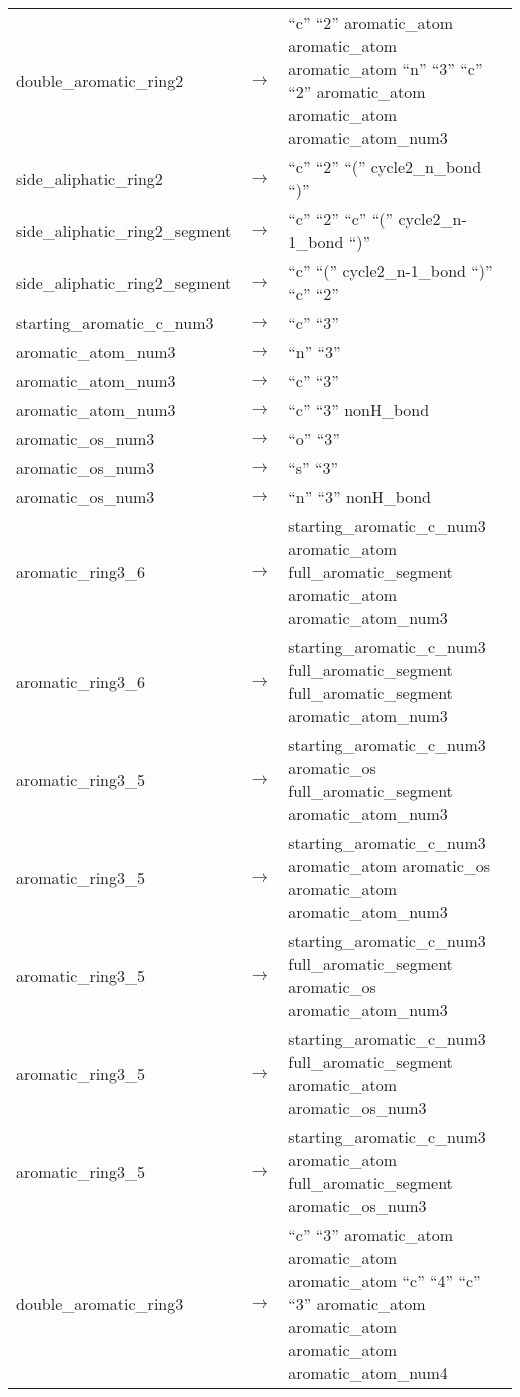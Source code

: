 \documentclass[../Document.tex]{subfiles}
\begin{document}
\begin{longtable}{m{} p{} p{}}
    double\_aromatic\_ring2 & $\rightarrow$ & ``c'' ``2'' aromatic\_atom aromatic\_atom aromatic\_atom ``n'' ``3'' ``c'' ``2'' aromatic\_atom aromatic\_atom aromatic\_atom\_num3 \\
    side\_aliphatic\_ring2 & $\rightarrow$ & ``c'' ``2'' ``('' cycle2\_n\_bond ``)'' \\
    side\_aliphatic\_ring2\_segment & $\rightarrow$ & ``c'' ``2'' ``c'' ``('' cycle2\_n-1\_bond ``)'' \\
    side\_aliphatic\_ring2\_segment & $\rightarrow$ & ``c'' ``('' cycle2\_n-1\_bond ``)'' ``c'' ``2'' \\
    starting\_aromatic\_c\_num3 & $\rightarrow$ & ``c'' ``3'' \\
    aromatic\_atom\_num3 & $\rightarrow$ & ``n'' ``3'' \\
    aromatic\_atom\_num3 & $\rightarrow$ & ``c'' ``3'' \\
    aromatic\_atom\_num3 & $\rightarrow$ & ``c'' ``3'' nonH\_bond \\
    aromatic\_os\_num3 & $\rightarrow$ & ``o'' ``3'' \\
    aromatic\_os\_num3 & $\rightarrow$ & ``s'' ``3'' \\
    aromatic\_os\_num3 & $\rightarrow$ & ``n'' ``3'' nonH\_bond \\
    aromatic\_ring3\_6 & $\rightarrow$ & starting\_aromatic\_c\_num3 aromatic\_atom full\_aromatic\_segment aromatic\_atom aromatic\_atom\_num3 \\
    aromatic\_ring3\_6 & $\rightarrow$ & starting\_aromatic\_c\_num3 full\_aromatic\_segment full\_aromatic\_segment aromatic\_atom\_num3 \\
    aromatic\_ring3\_5 & $\rightarrow$ & starting\_aromatic\_c\_num3 aromatic\_os full\_aromatic\_segment aromatic\_atom\_num3 \\
    aromatic\_ring3\_5 & $\rightarrow$ & starting\_aromatic\_c\_num3 aromatic\_atom aromatic\_os aromatic\_atom aromatic\_atom\_num3 \\
    aromatic\_ring3\_5 & $\rightarrow$ & starting\_aromatic\_c\_num3 full\_aromatic\_segment aromatic\_os aromatic\_atom\_num3 \\
    aromatic\_ring3\_5 & $\rightarrow$ & starting\_aromatic\_c\_num3 full\_aromatic\_segment aromatic\_atom aromatic\_os\_num3 \\
    aromatic\_ring3\_5 & $\rightarrow$ & starting\_aromatic\_c\_num3 aromatic\_atom full\_aromatic\_segment aromatic\_os\_num3 \\
    double\_aromatic\_ring3 & $\rightarrow$ & ``c'' ``3'' aromatic\_atom aromatic\_atom aromatic\_atom ``c'' ``4'' ``c'' ``3'' aromatic\_atom aromatic\_atom aromatic\_atom aromatic\_atom\_num4 \\

\end{longtable}
\end{document}
